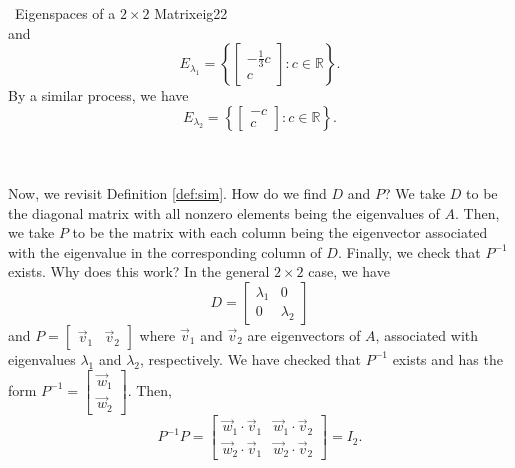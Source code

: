 \begin{example}{\Difficulty\,\Difficulty\,\,Eigenspaces of a \(2\times 2\) Matrix}{eig22}
\begin{equation*}
            \end{equation*}
            and
            \begin{equation*}
                E_{\lambda_1}=\left\{\begin{bmatrix} -\frac{1}{3}c \\ c \end{bmatrix}: c\in\mathbb{R}\right\}.
            \end{equation*}
            By a similar process, we have
            \begin{equation*}
                E_{\lambda_2}=\left\{\begin{bmatrix} -c \\ c \end{bmatrix}: c\in\mathbb{R}\right\}.
            \end{equation*}

        \end{example}
        \pagebreak
        \vphantom
        \\
        \\
        Now, we revisit Definition \ref{def:sim}. How do we find \(D\) and \(P\)? We take \(D\) to be the diagonal matrix with all nonzero elements being the eigenvalues of \(A\). Then, we take \(P\) to be the matrix with each column being the eigenvector associated with the eigenvalue in the corresponding column of \(D\). Finally, we check that \(P^{-1}\) exists. Why does this work? In the general \(2\times 2\) case, we have
        \begin{equation*}
            D=\begin{bmatrix}
                \lambda_1 & 0 \\ 0 & \lambda_2
            \end{bmatrix}
        \end{equation*}
        and \(P=\begin{bmatrix} \vec{v}_1 & \vec{v}_2 \end{bmatrix}\) where \(\vec{v}_1\) and \(\vec{v}_2\) are eigenvectors of \(A\), associated with eigenvalues \(\lambda_1\) and \(\lambda_2\), respectively. We have checked that \(P^{-1}\) exists and has the form \(P^{-1}=\begin{bmatrix} \vec{w}_1 \\ \vec{w}_2 \end{bmatrix}\). Then, 
        \begin{equation*}
            P^{-1}P=\begin{bmatrix} \vec{w}_1\cdot\vec{v}_1 & \vec{w}_1\cdot\vec{v}_2 \\ \vec{w}_2\cdot\vec{v}_1 & \vec{w}_2\cdot\vec{v}_2 \end{bmatrix}=I_2.
        \end{equation*}
